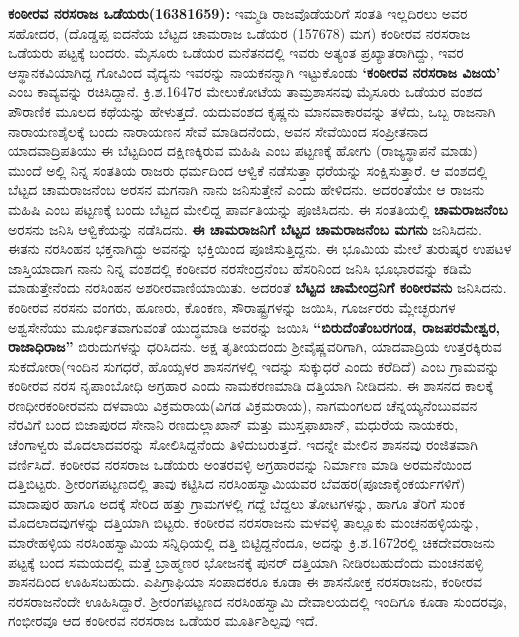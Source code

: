 \textbf{ ಕಂಠೀರವ ನರಸರಾಜ ಒಡೆಯರು(16381659):} ಇಮ್ಮಡಿ ರಾಜವೊಡೆಯರಿಗೆ ಸಂತತಿ ಇಲ್ಲದಿರಲು ಅವರ ಸಹೋದರ, (ದೊಡ್ಡಪ್ಪ ಐದನೆಯ ಬೆಟ್ಟದ ಚಾಮರಾಜ ಒಡೆಯರ (157678) ಮಗ) ಕಂಠೀರವ ನರಸರಾಜ ಒಡೆಯರು ಪಟ್ಟಕ್ಕೆ ಬಂದರು. ಮೈಸೂರು ಒಡೆಯರ ಮನೆತನದಲ್ಲಿ ಇವರು ಅತ್ಯಂತ ಪ್ರಖ್ಯಾತರಾಗಿದ್ದು, ಇವರ ಆಸ್ಥಾನಕವಿಯಾಗಿದ್ದ ಗೋವಿಂದ ವೈದ್ಯನು ಇವರನ್ನು ನಾಯಕನನ್ನಾಗಿ ಇಟ್ಟುಕೊಂಡು \textbf{‘ಕಂಠೀರವ ನರಸರಾಜ ವಿಜಯ’} ಎಂಬ ಕಾವ್ಯವನ್ನು ರಚಿಸಿದ್ದಾನೆ. ಕ್ರಿ.ಶ.1647ರ ಮೇಲುಕೋಟೆಯ ತಾಮ್ರಶಾಸನವು ಮೈಸೂರು ಒಡೆಯರ ವಂಶದ ಪೌರಾಣಿಕ ಮೂಲದ ಕಥೆಯನ್ನು ಹೇಳುತ್ತದೆ. ಯದುವಂಶದ ಕೃಷ್ಣನು ಮಾನವಾಕಾರವನ್ನು ತಳೆದು, ಒಬ್ಬ ರಾಜನಾಗಿ ನಾರಾಯಣಶೈಲಕ್ಕೆ ಬಂದು ನಾರಾಯಣನ ಸೇವೆ ಮಾಡಿದನೆಂದು, ಅವನ ಸೇವೆಯಿಂದ ಸಂಪ್ರೀತನಾದ ಯಾದವಾದ್ರಿಪತಿಯು ಈ ಬೆಟ್ಟದಿಂದ ದಕ್ಷಿಣಕ್ಕಿರುವ ಮಹಿಷಿ ಎಂಬ ಪಟ್ಟಣಕ್ಕೆ ಹೋಗು (ರಾಜ್ಯಸ್ಥಾಪನೆ ಮಾಡು) ಮುಂದೆ ಅಲ್ಲಿ ನಿನ್ನ ಸಂತತಿಯ ರಾಜರು ಧರ್ಮದಿಂದ ಆಳ್ವಿಕೆ ನಡೆಸುತ್ತಾ ಧರೆಯನ್ನು ಸಂಕ್ಷಿಸುತ್ತಾರೆ. ಆ ವಂಶದಲ್ಲಿ ಬೆಟ್ಟದ ಚಾಮರಾಜನೆಂಬ ಅರಸನ ಮಗನಾಗಿ ನಾನು ಜನಿಸುತ್ತೇನೆ ಎಂದು ಹೇಳಿದನು. ಅದರಂತೆಯೇ ಆ ರಾಜನು ಮಹಿಷಿ ಎಂಬ ಪಟ್ಟಣಕ್ಕೆ ಬಂದು ಬೆಟ್ಟದ ಮೇಲಿದ್ದ ಪಾರ್ವತಿಯನ್ನು ಪೂಜಿಸಿದನು. ಈ ಸಂತತಿಯಲ್ಲಿ \textbf{ಚಾಮರಾಜನೆಂಬ} ಅರಸನು ಜನಿಸಿ ಆಳ್ವಿಕೆಯನ್ನು ನಡೆಸಿದನು. \textbf{ಈ ಚಾಮರಾಜನಿಗೆ ಬೆಟ್ಟದ ಚಾಮರಾಜನೆಂಬ ಮಗನು} ಜನಿಸಿದನು. ಈತನು ನರಸಿಂಹನ ಭಕ್ತನಾಗಿದ್ದು ಅವನನ್ನು ಭಕ್ತಿಯಿಂದ ಪೂಜಿಸುತ್ತಿದ್ದನು. ಈ ಭೂಮಿಯ ಮೇಲೆ ತುರುಷ್ಕರ ಉಪಟಳ ಜಾಸ್ತಿಯಾದಾಗ ನಾನು ನಿನ್ನ ವಂಶದಲ್ಲಿ ಕಂಠೀವರ ನರಸೇಂದ್ರನೆಂಬ ಹೆಸರಿನಿಂದ ಜನಿಸಿ ಭೂಭಾರವನ್ನು ಕಡಿಮೆ ಮಾಡುತ್ತೇನೆಂದು ನರಸಿಂಹನ ಅಶರೀರವಾಣಿಯಾಯಿತು. ಅದರಂತೆ \textbf{ಬೆಟ್ಟದ ಚಾಮೇಂದ್ರನಿಗೆ ಕಂಠೀರವನು} ಜನಿಸಿದನು. ಕಂಠೀರವ ನರಸನು ವಂಗರು, ಹೂಣರು, ಕೊಂಕಣ, ಸೌರಾಷ್ಟ್ರಗಳನ್ನು ಜಯಿಸಿ, ಗೂರ್ಜರರು ಮ್ಲೇಚ್ಛರುಗಳ ಅಶ್ವಸೇನೆಯು ಮೂರ್ಛಿತವಾಗುವಂತೆ ಯುದ್ಧಮಾಡಿ ಅವರನ್ನು ಜಯಿಸಿ \textbf{“ಬಿರುದೆಂತೆಂಬರಗಂಡ, ರಾಜಪರಮೇಶ್ವರ, ರಾಜಾಧಿರಾಜ”} ಬಿರುದುಗಳನ್ನು ಧರಿಸಿದನು. ಅಕ್ಷ ತೃತೀಯದಂದು ಶ‍್ರೀವೈಷ್ಣವರಿಗಾಗಿ, ಯಾದವಾದ್ರಿಯ ಉತ್ತರಕ್ಕಿರುವ ಸುಕದೋರಾ(ಇಂದಿನ ಸುಗಧರೆ, ಹೊಯ್ಸಳರ ಶಾಸನಗಳಲ್ಲಿ ಇದನ್ನು ಸುಕ್ಕುಧರೆ ಎಂದು ಕರೆದಿದೆ) ಎಂಬ ಗ್ರಾಮವನ್ನು ಕಂಠೀರವ ನರಸ ನೃಪಾಂಬೋಧಿ ಅಗ್ರಹಾರ ಎಂದು ನಾಮಕರಣಮಾಡಿ ದತ್ತಿಯಾಗಿ ನೀಡಿದನು. ಈ ಶಾಸನದ ಕಾಲಕ್ಕೆ ರಣಧೀರಕಂಠೀರವನು ದಳವಾಯಿ ವಿಕ್ರಮರಾಯ(ವಿಗಡ ವಿಕ್ರಮರಾಯ), ನಾಗಮಂಗಲದ ಚೆನ್ನಯ್ಯನೆಂಬುವವನ ನೆರವಿಗೆ ಬಂದ ಬಿಜಾಪುರದ ಸೇನಾನಿ ರಣದುಲ್ಲಾಖಾನ್​ ಮತ್ತು ಮುಸ್ತಫಾಖಾನ್​, ಮಧುರೆಯ ನಾಯಕರು, ಚೆಂಗಾಳ್ವರು ಮೊದಲಾದವರನ್ನು ಸೋಲಿಸಿದ್ದನೆಂದು ತಿಳಿದುಬರುತ್ತದೆ. ಇದನ್ನೇ ಮೇಲಿನ ಶಾಸನವು ರಂಜಿತವಾಗಿ ವರ್ಣಿಸಿದೆ. ಕಂಠೀರವ ನರಸರಾಜ ಒಡೆಯರು ಅಂತರವಳ್ಳಿ ಅಗ್ರಹಾರವನ್ನು ನಿರ್ಮಾಣ ಮಾಡಿ ಅರಮನೆಯಿಂದ ದತ್ತಿಬಿಟ್ಟರು. ಶ‍್ರೀರಂಗಪಟ್ಟಣದಲ್ಲಿ ತಾವು ಕಟ್ಟಿಸಿದ ನರಸಿಂಹಸ್ವಾಮಿಯವರ ಬೆವಹರ(ಪೂಜಾಕೈಂಕರ್ಯ\-ಗಳಿಗೆ) ಮಾದಾಪುರ ಹಾಗೂ ಅದಕ್ಕೆ ಸೇರಿದ ಹತ್ತು ಗ್ರಾಮಗಳಲ್ಲಿ ಗದ್ದೆ ಬೆದ್ದಲು ತೋಟಗಳನ್ನು, ಹಾಗೂ ತೆರಿಗೆ ಸುಂಕ ಮೊದಲಾದವುಗಳನ್ನು ದತ್ತಿಯಾಗಿ ಬಿಟ್ಟರು. ಕಂಠೀರವ ನರಸರಾಜನು ಮಳವಳ್ಳಿ ತಾಲ್ಲೂಕು ಮಂಚನಹಳ್ಳಿಯನ್ನು, ಮಾರೇಹಳ್ಳಿಯ ನರಸಿಂಹಸ್ವಾಮಿಯ ಸನ್ನಿಧಿಯಲ್ಲಿ ದತ್ತಿ ಬಿಟ್ಟಿದ್ದನೆಂದೂ, ಅದನ್ನು ಕ್ರಿ.ಶ.1672ರಲ್ಲಿ ಚಿಕದೇವರಾಜನು ಪಟ್ಟಕ್ಕೆ ಬಂದ ಸಮಯದಲ್ಲಿ ಮತ್ತೆ ಬ್ರಾಹ್ಮಣರ ಭೋಜನಕ್ಕೆ ಪುನರ್​ ದತ್ತಿಯಾಗಿ ನೀಡಿರಬಹುದೆಂದು ಮಂಚನಹಳ್ಳಿ ಶಾಸನದಿಂದ ಊಹಿಸಬಹುದು. ಎಪಿಗ್ರಾಫಿಯಾ ಸಂಪಾದಕರೂ ಕೂಡಾ ಈ ಶಾಸನೋಕ್ತ ನರಸರಾಜನು, ಕಂಠೀರವ ನರಸರಾಜನೆಂದೇ ಊಹಿಸಿದ್ದಾರೆ. ಶ‍್ರೀರಂಗಪಟ್ಟಣದ ನರಸಿಂಹಸ್ವಾಮಿ ದೇವಾಲಯದಲ್ಲಿ ಇಂದಿಗೂ ಕೂಡಾ ಸುಂದರವೂ, ಗಂಭೀರವೂ ಆದ ಕಂಠೀರವ ನರಸರಾಜ ಒಡೆಯರ ಮೂರ್ತಿಶಿಲ್ಪವು ಇದೆ.

